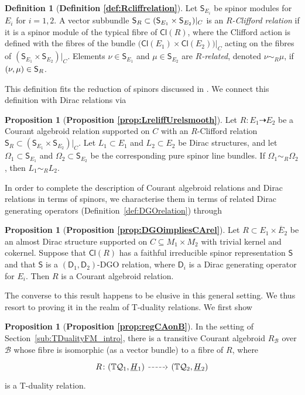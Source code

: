 \documentclass[a4paper, reqno, 11pt]{amsart}
\numberwithin{equation}{section}
\theoremstyle{definition}
\newtheorem{definition}[equation]{Definition}
\newtheorem{proposition}[equation]{Proposition}
\newcommand{\red}[1]{\underline{#1}}
\newcommand{\IT}{\mathbb{T}}
\newcommand{\Cl}{\mathsf{Cl}}
\newcommand{\cB}{{\mathcal B}}
\newcommand{\cQ}{{\mathcal Q}}
\newcommand{\sfD}{{\mathsf{D}}}
\newcommand{\sfS}{{\mathsf{S}}}
\newcommand{\rel}{\dashrightarrow}
\theoremstyle{remark}
\begin{document}
\begin{definition}[\textbf{Definition \ref{def:Rcliffrelation}}]
    Let $\sfS_{E_i}$ be spinor modules for $E_i$ for $i=1,2$. A vector subbundle ${\sf S}_R \subset (\sfS_{E_1}\times\sfS_{E_2})  \rvert_C$ is an \emph{$R$-Clifford relation} if it is a spinor module of the typical fibre of $\Cl(R)$, where the Clifford action is defined with the fibres of the bundle $\big(\Cl(E_1)\times \Cl(E_2)\big) \big\rvert_C$ acting on the fibres of $(\sfS_{E_1}\times\sfS_{E_2}) \rvert_C $. Elements $\nu \in\sfS_{E_1}$ and $\mu \in \sfS_{E_2}$ are \emph{$R$-related}, denoted $\nu \sim_R \mu$, if $(\nu,\mu) \in {\sf S}_R$.
\end{definition}

This definition fits the reduction of spinors discussed in \cite{Drummond:2011eq}. 
We  connect this definition with Dirac relations via

\begin{proposition}[\textbf{Proposition \ref{prop:LreliffUrelsmooth}}]
    Let $R \colon E_1 \rel E_2$ be a Courant algebroid relation supported on $C$ with an $R$-Clifford relation $\sfS_R \subset (\sfS_{E_1} \times \sfS_{E_2}) \rvert_C$. Let $L_1 \subset E_1$ and $L_2 \subset E_2$ be Dirac structures, and let $\Omega_1 \subset \sfS_{E_1}$ and $\Omega_2 \subset \sfS_{E_2}$ be the corresponding pure spinor line bundles. If $\Omega_1 \sim_R \Omega_2$, then $L_1 \sim_R L_2$.  
\end{proposition}

In order to complete the description of  Courant algebroid relations and Dirac relations in terms of spinors, we characterise them in terms of related Dirac generating operators (Definition~\ref{def:DGOrelation}) through

\begin{proposition}[\textbf{Proposition \ref{prop:DGOimpliesCArel}}]
    Let $R \subset E_1 \times \overline{E}_2$ be an almost Dirac structure supported on $C\subseteq M_1 \times M_2$ with trivial kernel and cokernel. Suppose that $\Cl(R)$ has a faithful irreducible spinor representation $\sfS$ and that $\sfS$ is a $(\sfD_1, \sfD_2)$-DGO relation, where $\sfD_i$ is a Dirac generating operator for $E_i$. Then $R$ is a Courant algebroid relation.
\end{proposition}

The converse to this result happens to be elusive in this general setting. We thus resort to proving it in the realm of T-duality relations. We first show 

\begin{proposition}[\textbf{Proposition \ref{prop:regCAonB}}]
\label{prop:5.17_intro}
    In the setting of Section~\ref{sub:TDualityFM_intro}, there is a transitive Courant algebroid $R_\cB$ over $\cB$ whose fibre is isomorphic (as a vector bundle) to a fibre of $R$, where 
\begin{equation}
\begin{tikzcd}
 R \colon (\IT\cQ_1,\red H{}_1) \ar[r,dashed] & (\IT\cQ_2,\red H{}_2)
 \end{tikzcd}
\end{equation} 
is a T-duality relation.
\end{proposition}
\end{document}
